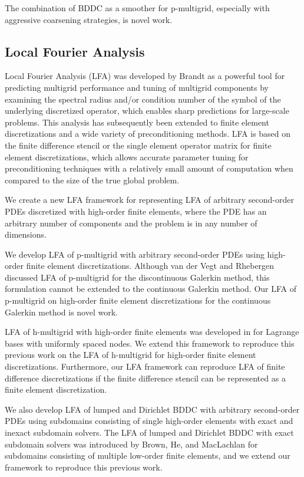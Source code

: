 The combination of BDDC as a smoother for p-multigrid, especially with aggressive coarsening strategies, is novel work.

\subsection{Local Fourier Analysis}

Local Fourier Analysis (LFA) was developed by Brandt \cite{brandt1977multi,wienands2004practical} as a powerful tool for predicting multigrid performance and tuning of multigrid components by examining the spectral radius and/or condition number of the symbol of the underlying discretized operator, which enables sharp predictions for large-scale problems.
This analysis has subsequently been extended to finite element discretizations and a wide variety of preconditioning methods.
LFA is based on the finite difference stencil or the single element operator matrix for finite element discretizations, which allows accurate parameter tuning for preconditioning techniques with a relatively small amount of computation when compared to the size of the true global problem.

We create a new LFA framework for representing LFA of arbitrary second-order PDEs discretized with high-order finite elements, where the PDE has an arbitrary number of components and the problem is in any number of dimensions.

We develop LFA of p-multigrid with arbitrary second-order PDEs using high-order finite element discretizations.
Although van der Vegt and Rhebergen \cite{van2011discrete} discussed LFA of p-multigrid for the discontinuous Galerkin method, this formulation cannot be extended to the continuous Galerkin method.
Our LFA of p-multigrid on high-order finite element discretizations for the continuous Galerkin method is novel work.

LFA of h-multigrid with high-order finite elements was developed in \cite{he2020two} for Lagrange bases with uniformly spaced nodes.
We extend this framework to reproduce this previous work on the LFA of h-multigrid for high-order finite element discretizations.
Furthermore, our LFA framework can reproduce LFA of finite difference discretizations if the finite difference stencil can be represented as a finite element discretization.

We also develop LFA of lumped and Dirichlet BDDC with arbitrary second-order PDEs using subdomains consisting of single high-order elements with exact and inexact subdomain solvers.
The LFA of lumped and Dirichlet BDDC with exact subdomain solvers was introduced by Brown, He, and MacLachlan \cite{brown2019local} for subdomains consisting of multiple low-order finite elements, and we extend our framework to reproduce this previous work.

